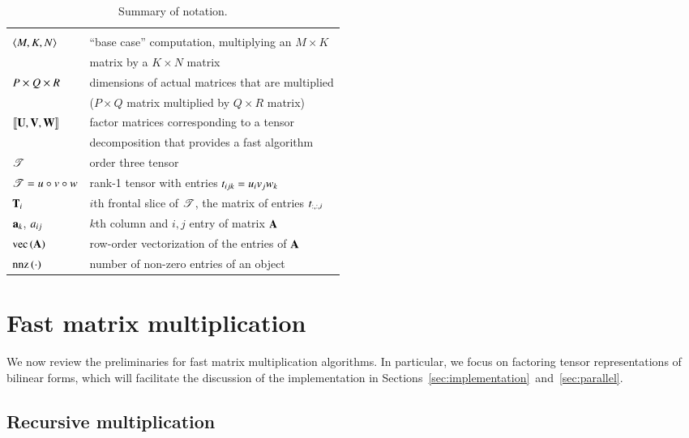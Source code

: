 \documentclass[preprint]{sigplanconf}
\newcommand{\V}[2][]{{\bm{#1\mathbf{\MakeLowercase{#2}}}}}
\newcommand{\M}[2][]{{\bm{#1\mathbf{\MakeUppercase{#2}}}}}
\newcommand{\MC}[3][]{\V[#1]{#2}_{#3}}
\newcommand{\ME}[3][]{#1{\MakeLowercase{#2}}_{#3}}
\newcommand{\T}[2][]{\boldsymbol{#1\mathscr{\MakeUppercase{#2}}}}
\newcommand{\TE}[3][]{#1{\MakeLowercase{#2}}_{#3}}
\newcommand{\Oprod}{\circ}
\begin{document}
\begin{table}[tb]
\centering
\caption{
Summary of notation.
}
\begin{tabular}{l l}
\toprule \\
$\left\langle M, K, N\right\rangle$ & ``base case'' computation, multiplying an $M \times K$  \\
& matrix by a $K \times N$ matrix \\
$P \times Q \times R$ & dimensions of actual matrices that are multiplied \\
& ($P \times Q$ matrix multiplied by $Q \times R$ matrix) \\
$\alg{\M{U}}{\M{V}}{\M{W}}$ & factor matrices corresponding to a tensor \\
& decomposition that provides a fast algorithm \\
$\T{T}$ & order three tensor \\
$\T{T} = u \Oprod v \Oprod w$ & rank-1 tensor with entries $\ME{T}{ijk} = u_iv_jw_k$ \\
$\M{T}_i$ & $i$th frontal slice of $\T{T}$, the matrix of entries $\TE{T}{:,:,i}$ \\
$\MC{A}{k}$, $\ME{A}{ij}$ & $k$th column and $i, j$ entry of matrix $\M{A}$ \\
$\vecmat{\M{A}}$ & row-order vectorization of the entries of $\M{A}$ \\
$\text{nnz}\left(\cdot\right)$ & number of non-zero entries of an object \\
\bottomrule
\end{tabular}
\label{tab:notation}
\end{table}

\section{Fast matrix multiplication}
\label{sec:fast}

We now review the preliminaries for fast matrix multiplication algorithms.
In particular, we focus on factoring tensor representations of bilinear forms,
which will facilitate the discussion of the implementation in Sections~\ref{sec:implementation}~and~\ref{sec:parallel}.

\subsection{Recursive multiplication}
\label{sec:recursive}
\end{document}
